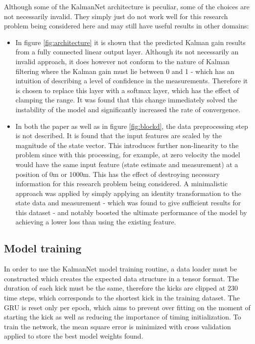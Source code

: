 \documentclass[a4paper,twoside,12pt]{report}
\begin{document}
Although some of the KalmanNet architecture is peculiar, some of the choices are not necessarily invalid. They simply just do not work well for this research problem being considered here and may still have useful results in other domains:
\begin{itemize}
    \item In figure \ref{fig:architecture} it is shown that the predicted Kalman gain results from a fully connected linear output layer. Although its not necessarily an invalid approach, it does however not conform to the nature of Kalman filtering where the Kalman gain must lie between 0 and 1 - which has an intuition of describing a level of confidence in the measurements. Therefore it is chosen to replace this layer with a softmax layer, which has the effect of clamping the range. It was found that this change immediately solved the instability of the model and significantly increased the rate of convergence.
    \item In both the paper as well as in figure \ref{fig:blockd}, the data preprocessing step is not described. It is found that the input features are scaled by the magnitude of the state vector. This introduces further non-linearity to the problem since with this processing, for example, at zero velocity the model would have the same input feature (state estimate and measurement) at a position of 0m or 1000m. This has the effect of destroying necessary information for this research problem being considered. A minimalistic approach was applied by simply applying an identity transformation to the state data and measurement - which was found to give sufficient results for this dataset - and notably boosted the ultimate performance of the model by achieving a lower loss than using the existing feature.
\end{itemize}


\subsection{Model training}

In order to use the KalmanNet model training routine, a data loader must be constructed which creates the expected data structure in a tensor format. The duration of each kick must be the same, therefore the kicks are clipped at 230 time steps, which corresponds to the shortest kick in the training dataset. The GRU is reset only per epoch, which aims to prevent over fitting on the moment of starting the kick as well as reducing the importance of timing initialization. To train the network, the mean square error is minimized with cross validation applied to store the best model weights found.
\end{document}
